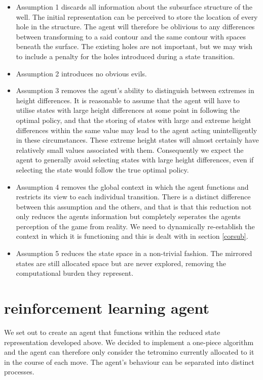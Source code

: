 \documentclass{rucsthesis}
\begin{document}
\begin{itemize}
\item{Assumption 1 discards all information about the subsurface structure of the well. The initial representation can be perceived to store the location of every hole in the structure. The agent will therefore be oblivious to any differences between transforming to a said contour and the same contour with spaces beneath the surface. The existing holes are not important, but we may wish to include a penalty for the holes introduced during a state transition.}
\item{Assumption 2 introduces no obvious evils.}
\item{Assumption 3 removes the agent's ability to distinguish between extremes in height differences. It is reasonable to assume that the agent will have to utilise states with large height differences at some point in following the optimal policy, and that the storing of states with large and extreme height differences within the same value may lead to the agent acting unintelligently in these circumstances. These extreme height states will almost certainly have relatively small values associated with them. Consequently we expect the agent to generally avoid selecting states with large height differences, even if selecting the state would follow the true optimal policy.}
\item{Assumption 4 removes the global context in which the agent functions and restricts its view to each individual transition. There is a distinct difference between this assumption and the others, and that is that this reduction not only reduces the agents information but completely seperates the agents perception of the game from reality. We need to dynamically re-establish the context in which it is functioning and this is dealt with in section \ref{corsub}.}
\item{Assumption 5 reduces the state space in a non-trivial fashion. The mirrored states are still allocated space but are never explored, removing the computational burden they represent.}
\end{itemize}

\section{reinforcement learning agent}

We set out to create an agent that functions within the reduced state representation developed above. We decided to implement a one-piece algorithm and the agent can therefore only consider the tetromino currently allocated to it in the course of each move. The agent's behaviour can be separated into distinct processes.
\end{document}
